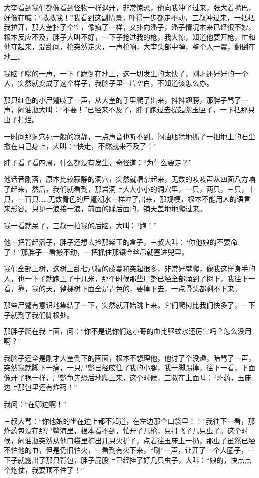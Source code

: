 大奎看到我们都像看到怪物一样退开，非常惊恐，他向我冲了过来，张大着嘴巴，好像在喊：“救救我！”我看到这副情景，吓得一步都走不动，三叔冲过来，一把把我拉开，那大奎扑了个空，像疯了一样，又扑向潘子，潘子情况本来已经很不妙，根本反应不及，胖子大叫不好，一下子抢过我的枪，我大惊，知道他要开枪，忙和他夺起来，混乱间，枪突然走火，一声枪响，大奎头部中弹，整个人一震，翻倒在地上。

我脑子嗡的一声，一下子跪倒在地上，这一切发生的太快了，刚才还好好的一个人，突然就变成了这个样子，我脑子里一片空白，不知道该怎么办。

那只红色的小尸蹩吱了一声，从大奎的手里爬了出来，抖抖翅膀，那胖子骂了一声，闷油瓶大叫：“不要！”已经来不及了，胖子跑过去操起紫玉匣子，一下把那只虫子打烂。

一时间那洞穴死一般的寂静，一点声音也听不到。闷油瓶猛地抓了一把地上的石尘撒在自己身上，大叫：“快走，不然就来不及了！”

胖子看了看四周，什么都没有发生，奇怪道：“为什么要走？”

他话音刚落，原本比较寂静的洞穴，突然就嘈杂起来，无数的吱吱声从四面八方响了起来，然后，我们就看到，那岩洞上大大小小的洞穴里，一只，两只，三只，十只，一百只……无数青色的尸蹩潮水一样冲了出来，那规模，根本不能用人的语言来形容。只见一浪接一浪，前面的踩后面的，铺天盖地地爬过来。

我一看就呆了，三叔一拍我的后脑，大叫：“跑！”

他一把背起潘子，胖子还想去捡那紫玉的盒子，三叔大叫：“你他娘的不要命了！”那胖子一看搬不动，一把抓住那镶金丝帛就塞进兜里。

我们全部上树，这树上乱七八糟的藤蔓和突起很多，非常好攀爬，像我这样身手的人，也一下子就跑上了十几米，那个时候那些尸蹩已经全部涌到了树下，我往下一看，靠，我的天，整棵树下面全是青色的，要掉下去，一点骨头都剩不下来。

那些尸蹩有意识地集结了一下，突然就开始跳上来。它们爬树比我们快多了，一下子就到了我们脚根处。

那胖子爬在我上面，问：“你不是说你们这小哥的血比驱蚊水还厉害吗？怎么没用啊？”

我脑子还全是刚才大奎倒下的画面，根本不想理他，他讨了个没趣，暗骂了一声，突然我就脚下一痛，一只尸蹩已经咬住了我的小腿，我一脚踢掉，往下一看，下面像开了锅一样，尸蹩争先恐后地爬上来，这个时候，三叔在上面叫：“炸药，玉床边上那包里还有炸药！”

我问：“在哪边啊！”

三叔大骂：“你他娘的坐在边上都不知道，在左边那个口袋里！！”我往下一看，那炸药包没在那尸鳖海里，根本看不到，忙开了几枪，只打飞了几只虫子。这个时候，闷油瓶突然从他口袋里掏出几只火折子，点着往玉床上一扔，那虫子虽然已经不怕他的血，但是仍旧怕火，一看到有火下来，“刷”一声，让开了一个大圈子，一下子就露出了那只背包，胖子屁股上已经挂了好几只虫子，大叫：“娘的，快点点个炮仗，我要顶不住了！”


